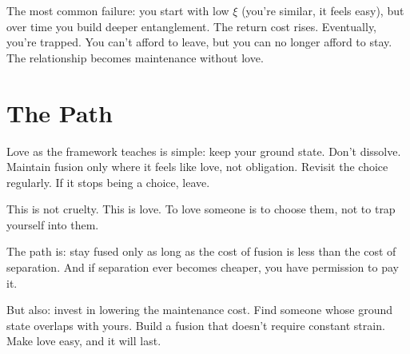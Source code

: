 \documentclass[12pt]{article}
\begin{document}
The most common failure: you start with low $\xi$ (you're similar, it feels easy), but over time you build deeper entanglement. The return cost rises. Eventually, you're trapped. You can't afford to leave, but you can no longer afford to stay. The relationship becomes maintenance without love.

\section{The Path}

Love as the framework teaches is simple: keep your ground state. Don't dissolve. Maintain fusion only where it feels like love, not obligation. Revisit the choice regularly. If it stops being a choice, leave.

This is not cruelty. This is love. To love someone is to choose them, not to trap yourself into them.

The path is: stay fused only as long as the cost of fusion is less than the cost of separation. And if separation ever becomes cheaper, you have permission to pay it.

But also: invest in lowering the maintenance cost. Find someone whose ground state overlaps with yours. Build a fusion that doesn't require constant strain. Make love easy, and it will last.
\end{document}
